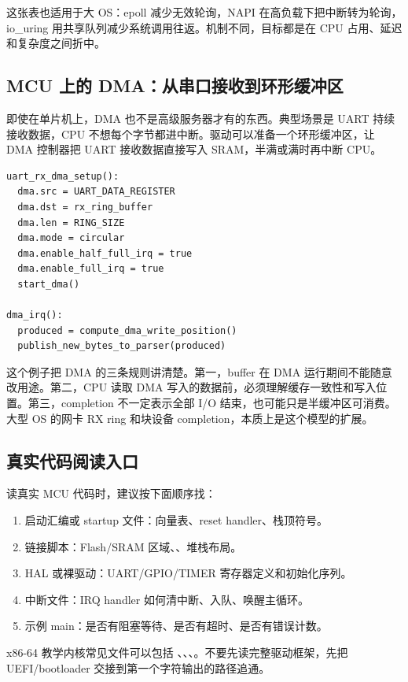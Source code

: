 这张表也适用于大 OS：epoll 减少无效轮询，NAPI 在高负载下把中断转为轮询，io\_uring 用共享队列减少系统调用往返。机制不同，目标都是在 CPU 占用、延迟和复杂度之间折中。

\subsection{MCU 上的 DMA：从串口接收到环形缓冲区}

即使在单片机上，DMA 也不是高级服务器才有的东西。典型场景是 UART 持续接收数据，CPU 不想每个字节都进中断。驱动可以准备一个环形缓冲区，让 DMA 控制器把 UART 接收数据直接写入 SRAM，半满或满时再中断 CPU。

\begin{lstlisting}
uart_rx_dma_setup():
  dma.src = UART_DATA_REGISTER
  dma.dst = rx_ring_buffer
  dma.len = RING_SIZE
  dma.mode = circular
  dma.enable_half_full_irq = true
  dma.enable_full_irq = true
  start_dma()

dma_irq():
  produced = compute_dma_write_position()
  publish_new_bytes_to_parser(produced)
\end{lstlisting}

这个例子把 DMA 的三条规则讲清楚。第一，buffer 在 DMA 运行期间不能随意改用途。第二，CPU 读取 DMA 写入的数据前，必须理解缓存一致性和写入位置。第三，completion 不一定表示全部 I/O 结束，也可能只是半缓冲区可消费。大型 OS 的网卡 RX ring 和块设备 completion，本质上是这个模型的扩展。

\subsection{真实代码阅读入口}

读真实 MCU 代码时，建议按下面顺序找：

\begin{enumerate}
\tightlist
\item 启动汇编或 startup 文件：向量表、reset handler、栈顶符号。
\item 链接脚本：Flash/SRAM 区域、、堆栈布局。
\item HAL 或裸驱动：UART/GPIO/TIMER 寄存器定义和初始化序列。
\item 中断文件：IRQ handler 如何清中断、入队、唤醒主循环。
\item 示例 main：是否有阻塞等待、是否有超时、是否有错误计数。
\end{enumerate}

x86-64 教学内核常见文件可以包括 、、、。不要先读完整驱动框架，先把 UEFI/bootloader 交接到第一个字符输出的路径追通。
